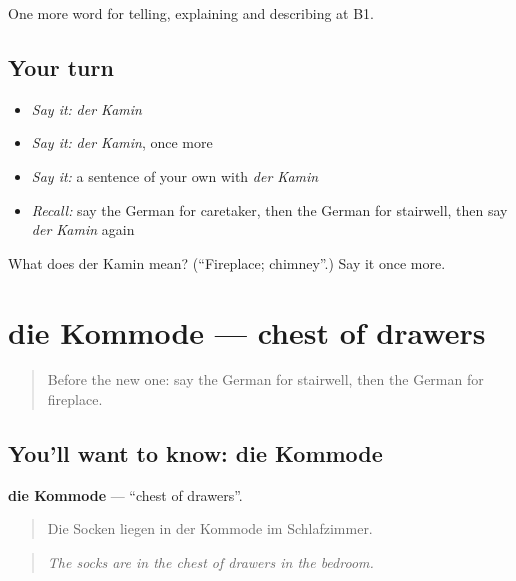 \begin{grammarlens}[title={What you've built}]
One more word for telling, explaining and describing at B1.
\end{grammarlens}

\subsection*{Your turn}
\begin{itemize}
\raggedright
  \item \emph{Say it:} \emph{der Kamin}
  \item \emph{Say it:} \emph{der Kamin}, once more
  \item \emph{Say it:} a sentence of your own with \emph{der Kamin}
  \item \emph{Recall:} say the German for caretaker, then the German for stairwell, then say \emph{der Kamin} again
\end{itemize}

\begin{tcolorbox}[breakable,colback=teal!4,colframe=teal!35!black,title={Before you move on}]
What does der Kamin mean? (\textquotedblleft{}Fireplace; chimney\textquotedblright{}.) Say it once more.
\end{tcolorbox}
\section[die Kommode]{die Kommode — chest of drawers}

\label{lesson:GE-C533-kommode}



\begin{quote}
Before the new one: say the German for stairwell, then the German for fireplace.
\end{quote}

\subsection*{You'll want to know: die Kommode}
\textbf{die Kommode} — \textquotedblleft{}chest of drawers\textquotedblright{}.

\begin{quote}
Die Socken liegen in der Kommode im Schlafzimmer.
\end{quote}

\begin{quote}
\emph{The socks are in the chest of drawers in the bedroom.}
\end{quote}

